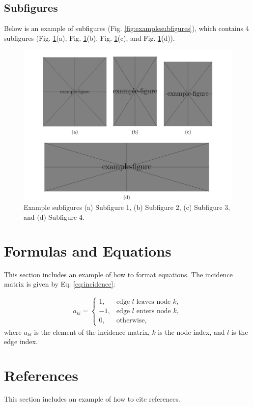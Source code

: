 \documentclass[a4paper]{article}
\begin{document}
\subsection{Subfigures}

Below is an example of subfigures (Fig. \ref{fig:examplesubfigures}), which contains 4 subfigures (Fig. \ref{multifig:multifig_examplesubfigures}(a), Fig. \ref{multifig:multifig_examplesubfigures}(b), Fig. \ref{multifig:multifig_examplesubfigures}(c), and Fig. \ref{multifig:multifig_examplesubfigures}(d)).


\begin{figure}[htbp]
    \centering
    \includegraphics[width=\linewidth]{multifig_examplesubfigures.png}
    \caption{
        Example subfigures (a) Subfigure 1, (b) Subfigure 2, (c) Subfigure 3, and (d) Subfigure 4.
    }
    \label{multifig:multifig_examplesubfigures}
\end{figure}

\section{Formulas and Equations}

This section includes an example of how to format equations. The incidence matrix is given by Eq. \ref{eq:incidence}:

\begin{align}\label{eq:incidence}
    a_{kl}=
    \begin{cases}
        1,  & \text{edge $l$ leaves node $k$},\\
        -1, & \text{edge $l$ enters node $k$},\\
        0,  & \text{otherwise},
    \end{cases}
\end{align}
where $a_{kl}$ is the element of the incidence matrix, $k$ is the node index, and $l$ is the edge index.

\section{References}

This section includes an example of how to cite references\cite{article1}.



\end{document}
